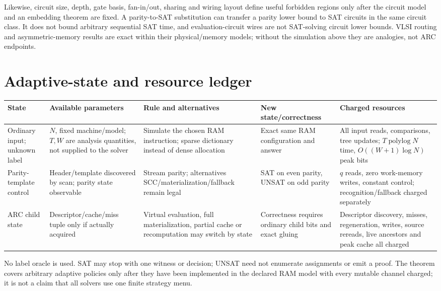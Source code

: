 \documentclass[11pt]{article}
\begin{document}
Likewise, circuit size, depth, gate basis, fan-in/out, sharing and wiring
layout define useful forbidden regions only after the circuit model and an
embedding theorem are fixed.  A parity-to-SAT substitution can transfer a
parity lower bound to SAT circuits in the same circuit class.  It does not
bound arbitrary sequential SAT time, and evaluation-circuit wires are not
SAT-solving circuit lower bounds.  VLSI routing and asymmetric-memory results
are exact within their physical/memory models; without the simulation above
they are analogies, not ARC endpoints.

\section{Adaptive-state and resource ledger}
\begin{center}
\small
\begin{tabular}{p{.15\linewidth}p{.18\linewidth}p{.19\linewidth}p{.19\linewidth}p{.19\linewidth}}
\toprule
State & Available parameters & Rule and alternatives & New state/correctness & Charged resources\\
\midrule
Ordinary input; unknown label & $N$, fixed machine/model; $T,W$ are analysis quantities, not supplied to the solver & Simulate the chosen RAM instruction; sparse dictionary instead of dense allocation & Exact same RAM configuration and answer & All input reads, comparisons, tree updates; $T\operatorname{polylog}N$ time, $O((W+1)\log N)$ peak bits\\
Parity-template control & Header/template discovered by scan; parity state observable & Stream parity; alternatives SCC/materialization/fallback remain legal & SAT on even parity, UNSAT on odd parity & $q$ reads, zero work-memory writes, constant control; recognition/fallback charged separately\\
ARC child state & Descriptor/cache/miss tuple only if actually acquired & Virtual evaluation, full materialization, partial cache or recomputation may switch by state & Correctness requires ordinary child bits and exact gluing & Descriptor discovery, misses, regeneration, writes, source rereads, live ancestors and peak cache all charged\\
\bottomrule
\end{tabular}
\end{center}
No label oracle is used.  SAT may stop with one witness or decision; UNSAT need
not enumerate assignments or emit a proof.  The theorem covers arbitrary
adaptive policies only after they have been implemented in the declared RAM
model with every mutable channel charged; it is not a claim that all solvers
use one finite strategy menu.
\end{document}
